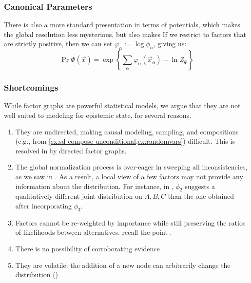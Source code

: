 \documentclass{article}
\numberwithin{equation}{section}
\begin{document}
	\subsubsection{Canonical Parameters}
	There is also a more standard presentation in terms of potentials, which makes the global resolution less mysterious, but also makes
	If we restrict to factors that are strictly positive, %
	then we can set $ \varphi_\alpha := \log \phi_\alpha$, giving us:
	\[ \Pr{\Phi} (\vec x)  = \exp \left\{ \sum_\alpha \varphi_\alpha(\vec x_\alpha)  - \ln Z_\Phi \right\} \] 
	
	

	\subsubsection{Shortcomings}

	While factor graphs are powerful statistical models, we argue that they are not well suited to modeling for epistemic state, for several reasons. 

	\begin{enumerate}
		\item They are undirected, making causal modeling, sampling, and compositions (e.g., from \cref{ex:sd-compose-unconditional,ex:randomvars}) difficult. This is resolved in \parencite{frey2012extending} by directed factor graphs. 
		\label{fgproblem:undirected}
		\item The global normalization process is over-eager in sweeping all inconsistencies, as we saw in . As a result, a local view of a few factors may not provide any information about the distribution. For instance, in  , $\phi_2$ suggests a qualitatively different joint distribution on $A,B,C$ than the one obtained after incorporating $\phi_3$. \label{fgproblem:global}
		\item Factors cannot be re-weighted by importance while still preserving the ratios of likelihoods between alternatives. recall the point . \label{fgproblem:reweight}
		\item There is no possibility of corroborating evidence \label{fgproblem:corrob}
		\item They are volatile: the addition of a new node can arbitrarily change the distribution \label{fgproblem:volatile} ()
	\end{enumerate}
\end{document}
